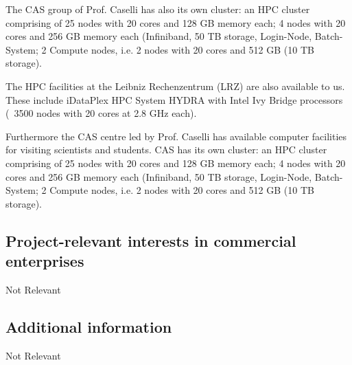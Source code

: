 \documentclass[10pt,fleqn,twoside]{article}
\newcommand{\Tcol}{\color{blue}}
\begin{document}
The CAS group of Prof. Caselli has also its own cluster: an HPC
cluster comprising of 25 nodes with 20 cores and 128 GB memory each; 4
nodes with 20 cores and 256 GB memory each (Infiniband, 50 TB storage,
Login-Node, Batch-System; 2 Compute nodes, i.e. 2 nodes with 20 cores
and 512 GB (10 TB storage).  

The HPC facilities at the Leibniz Rechenzentrum (LRZ) are also
available to us. These include iDataPlex HPC System HYDRA with Intel
Ivy Bridge processors (~3500 nodes with 20 cores at 2.8 GHz each). 

Furthermore the CAS centre led by Prof. Caselli has available computer
facilities for visiting scientists and students. CAS has its own
cluster: an HPC cluster comprising of 25 nodes with 20 cores and 128
GB memory each; 4 nodes with 20 cores and 256 GB memory each
(Infiniband, 50 TB storage, Login-Node, Batch-System; 2 Compute nodes,
i.e. 2 nodes with 20 cores and 512 GB (10 TB storage).  


\subsection{\Tcol Project-relevant interests in commercial enterprises}

Not Relevant


\subsection{\Tcol Additional information}

Not Relevant
\end{document}
